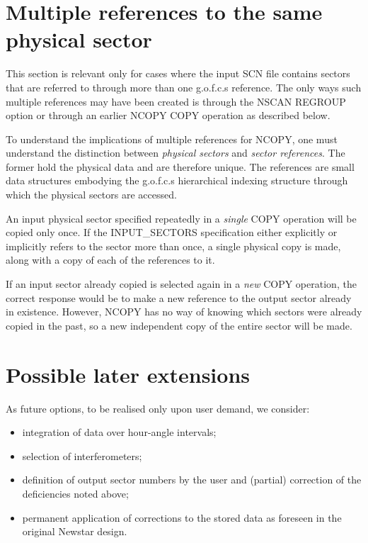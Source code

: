 \section{Multiple references to the same physical sector}

	This section is relevant only for cases where the input SCN file
contains sectors that are referred to through more than one g.o.f.c.s
reference. The only ways such multiple references may have been created is
through the NSCAN REGROUP option or through an earlier NCOPY COPY operation as
described below.

	To understand the implications of multiple references for NCOPY,
one must understand the distinction between {\em physical sectors} and {\em
sector references}. The former hold the physical data and are therefore
unique. The references are small data structures embodying the g.o.f.c.s
hierarchical indexing structure through which the physical sectors are
accessed.

	An input physical sector specified repeatedly in a {\em single} COPY
operation will be copied only once. If the INPUT\_SECTORS specification either
explicitly or implicitly refers to the sector more than once, a single
physical copy is made, along with a copy of each of the references to it.

	If an input sector already copied is selected again in a {\em new}
COPY operation, the correct response would be to make a new reference to the
output sector already in existence. However, NCOPY has no way of knowing which
sectors were already copied in the past, so a new independent copy of the
entire sector will be made.


\section{Possible later extensions}

	As future options, to be realised only upon user demand, we
consider:
\begin{itemize}

\item   integration of data over hour-angle intervals;

\item   selection of interferometers;

\item   definition of output sector numbers by the user and (partial)
correction of the deficiencies noted above;

\item   permanent application of corrections to the stored data as foreseen in
the original Newstar design.

\end{itemize}


